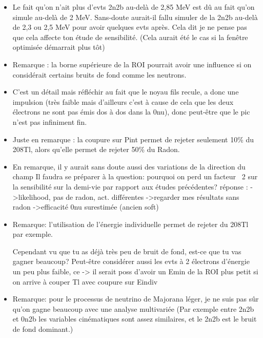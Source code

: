 \documentclass[a4paper,12pt, twoside]{memoir}   	%
\begin{document}
\begin{itemize}
               \item Le fait qu'on n'ait plus d'evts 2n2b au-delà de 2,85 MeV est dû au fait qu'on simule au-delà de 2 MeV. Sans-doute aurait-il fallu simuler de la 2n2b au-delà de 2,3 ou 2,5 MeV pour avoir quelques evts après. Cela dit je ne pense pas que cela affecte ton étude de sensibilité. (Cela aurait été le cas si la fenêtre optimisée démarrait plus tôt)
               \item Remarque : la borne supérieure de la ROI pourrait avoir une influence si on considérait certains bruits de fond comme les neutrons.
               \item C'est un détail mais réfléchir au fait que le noyau fils recule, a donc une impulsion (très faible mais d'ailleurs c'est à cause de cela que les deux électrons ne sont pas émis dos à dos dans la 0nu), donc peut-être que le pic n'est pas infiniment fin.
               \item Juste en remarque : la coupure sur Pint permet de rejeter seulement 10\% du 208Tl, alors qu'elle permet de rejeter 50\% du Radon.
               \item En remarque, il y aurait sans doute aussi des variations de la direction du champ
                 Il faudra se préparer à la question: pourquoi on perd un facteur ~2 sur la sensibilité sur la demi-vie par rapport aux études précédentes?
                 réponse :
                 ->likelihood, pas de radon, act. différentes
                 ->regarder mes résultats sans radon
                 ->efficacité 0nu surestimée (ancien soft)
                 \item Remarque: l'utilisation de l'énergie individuelle permet de rejeter du 208Tl par exemple.

Cependant vu que tu as déjà très peu de bruit de fond, est-ce que tu vas gagner beaucoup? Peut-être considérer aussi les evts à 2 électrons d'énergie un peu plus faible, ce -> il serait poss d'avoir un Emin de la ROI plus petit si on arrive à couper Tl avec coupure sur Eindiv
                   \item Remarque: pour le processus de neutrino de Majorana léger, je ne suis pas sûr qu'on gagne beaucoup avec une analyse multivariée
(Par exemple entre 2n2b et 0n2b les variables cinématiques sont assez similaires, et le 2n2b est le bruit de fond dominant.)
               \end{itemize}
\end{document}
